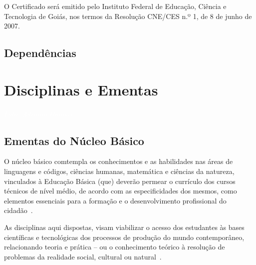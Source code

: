 \documentclass[11pt,fleqn]{book} %
\begin{document}
O Certificado será emitido pelo Instituto Federal de Educação, Ciência e Tecnologia de Goiás, nos termos da Resolução CNE/CES n.º 1, de 8 de junho de 2007.	


\section{Dependências}
\indent




\chapter{Disciplinas e Ementas}
\vspace{6em}
\begin{flushright}
	\textit{\textcolor{white}{Foto: Adriano Darosci}}
\end{flushright}
\vspace{12em}

\section{Ementas do Núcleo Básico}\label{ementasBasico}
\indent

O núcleo básico comtempla os conhecimentos e as habilidades nas áreas de linguagens e códigos, ciências humanas, matemática e ciências da natureza, vinculados à Educação Básica (que) deverão permear o currículo dos cursos técnicos de nível médio, de acordo com as especificidades dos mesmos, como elementos essenciais para a formação e o desenvolvimento profissional do cidadão~\cite{Resolucao06De2012}.

As disciplinas aqui dispostas, visam viabilizar o acesso dos estudantes às bases científicas e tecnológicas dos processos de produção do mundo contemporâneo, relacionando teoria e prática – ou o conhecimento teórico à resolução de problemas da realidade social, cultural ou natural~\cite{BNCC2019}.

\newpage
\end{document}
